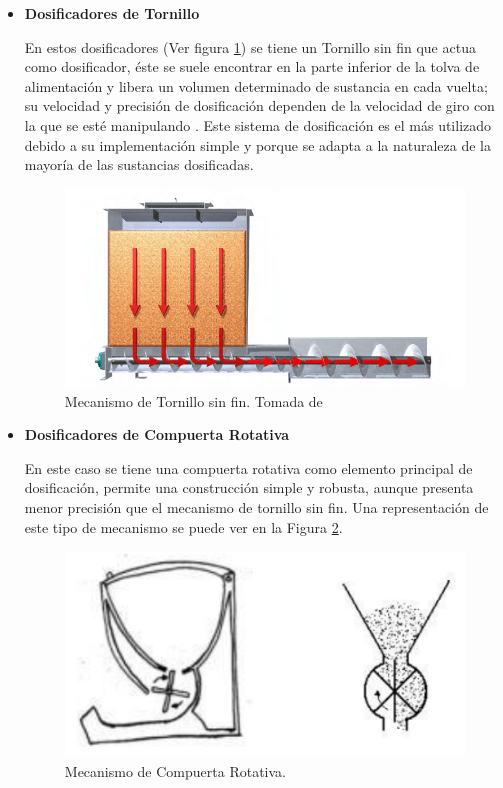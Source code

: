 	\begin{itemize}
	
		\item \textbf{Dosificadores de Tornillo} %
		
		En estos dosificadores (Ver figura \ref{torni}) se tiene un Tornillo sin fin que actua como dosificador, éste se suele encontrar en la parte inferior de la tolva de alimentación y libera un volumen determinado de sustancia en cada vuelta; su velocidad y precisión de dosificación dependen de la velocidad de giro con la que se esté manipulando \cite{torres}. Este sistema de dosificación es el más utilizado debido a su implementación simple y porque se adapta a la naturaleza de la mayoría de las sustancias dosificadas.
		\begin{figure}[H]
			\begin{center}
				\includegraphics[scale=0.7]{img/tornillo.png}
			\end{center}
			\caption{Mecanismo de Tornillo sin fin. Tomada de \cite{DEM} \label{torni}}
		\end{figure} %
		
		\item \textbf{Dosificadores de Compuerta Rotativa} %
		
		En este caso se tiene una compuerta rotativa como elemento principal de dosificación, permite una construcción simple y robusta, aunque presenta menor precisión que el mecanismo de tornillo sin fin. Una representación de este tipo de mecanismo se puede ver en la Figura \ref{rotala}.
		\begin{figure}[H]
			\begin{center}
				\includegraphics[scale=0.9]{img/rotar.png}
			\end{center}
			\caption{Mecanismo de Compuerta Rotativa. \label{rotala}}
		\end{figure} %
		

\end{itemize}
